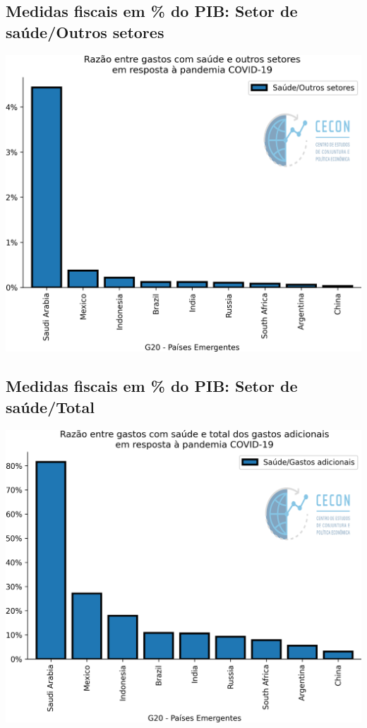 \documentclass{SelfArx}
\begin{document}
\subsection*{Medidas fiscais em \% do PIB: Setor de saúde/Outros setores}
\label{sec:org68b4301}

\begin{center}
\includegraphics[width=.9\linewidth]{./figs/IMF/FiscalMonitor_Covid_ratio.png}
\end{center}

\subsection*{Medidas fiscais em \% do PIB: Setor de saúde/Total}
\label{sec:orgf1bb499}

\begin{center}
\includegraphics[width=.9\linewidth]{./figs/IMF/FiscalMonitor_Covid_total.png}
\end{center}
\end{document}

